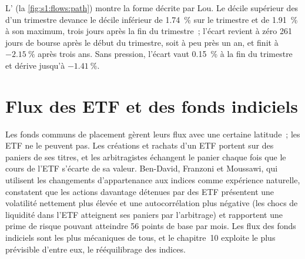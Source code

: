 \begin{omfigure}

\label{fig:s1:flows:path}
\end{omfigure}

L' (la \cref{fig:s1:flows:path}) montre la forme décrite par Lou. Le décile supérieur des  d'un trimestre devance le décile inférieur de 1.74~\% sur le
trimestre et de 1.91~\% à son maximum, trois jours après la fin du trimestre~; l'écart revient à zéro 261 jours de bourse après le début du trimestre, soit à peu près un an, et finit à $-2.15~\%$ après
trois ans. Sans pression, l'écart vaut 0.15~\% à la fin du trimestre et dérive jusqu'à $-1.41~\%$.

\section{Flux des ETF et des fonds indiciels}

Les fonds communs de placement gèrent leurs flux avec une certaine latitude~; les ETF ne le peuvent pas. Les créations et rachats d'un ETF portent sur des paniers de ses titres, et
les arbitragistes échangent le panier chaque fois que le cours de l'ETF s'écarte de sa valeur. Ben-David, Franzoni et Moussawi, qui utilisent les changements d'appartenance aux indices comme
expérience naturelle, constatent que les actions davantage détenues par des ETF présentent une volatilité nettement plus élevée et une autocorrélation plus négative (les chocs de liquidité dans l'ETF
atteignent ses paniers par l'arbitrage) et rapportent une prime de risque pouvant atteindre 56 points de base par mois. Les flux des fonds indiciels sont les plus mécaniques de tous,
et le chapitre~10 exploite le plus prévisible d'entre eux, le rééquilibrage des indices.

